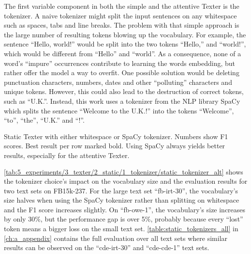 The first variable component in both the simple and the attentive Texter is the tokenizer. A naive tokenizer might split the input sentences on any whitespace such as spaces, tabs and line breaks. The problem with that simple approach is the large number of resulting tokens blowing up the vocabulary. For example, the sentence ``Hello, world!'' would be split into the two tokens ``Hello,'' and ``world!'', which would be different from ``Hello'' and ``world''. As a consequence, none of a word's ``impure'' occurrences contribute to learning the words embedding, but rather offer the model a way to overfit. One possible solution would be deleting punctuation characters, numbers, dates and other ``polluting'' characters and unique tokens. However, this could also lead to the destruction of correct tokens, such as ``U.K.''. Instead, this work uses a tokenizer from the NLP library SpaCy~\cite{SpaCy} which splits the sentence ``Welcome to the U.K.!'' into the tokens ``Welcome'', ``to'', ``the'', ``U.K.'' and ``!''.

\begin{table}[h]
    \centering
    
    \caption{Static Texter with either whitespace or SpaCy tokenizer. Numbers show F1 scores. Best result per row marked bold. Using SpaCy always yields better results, especially for the attentive Texter.}
    \label{tab:5_experiments/3_texter/2_static/1_tokenizer/static_tokenizer_alt}
\end{table}

\autoref{tab:5_experiments/3_texter/2_static/1_tokenizer/static_tokenizer_alt} shows the tokenizer choice's impact on the vocabulary size and the evaluation results for two text sets on FB15k-237. For the large text set ``fb-irt-30'', the vocabulary's size halves when using the SpaCy tokenizer rather than splitting on whitespace and the F1 score increases slightly. On ``fb-owe-1'', the vocabulary's size increases by only 30\%, but the performance gap is over 5\%, probably because every ``lost'' token means a bigger loss on the small text set. \autoref{table:static_tokenizers_all} in \autoref{ch:a_appendix} contains the full evaluation over all text sets where similar results can be observed on the ``cde-irt-30'' and ``cde-cde-1'' text sets.
